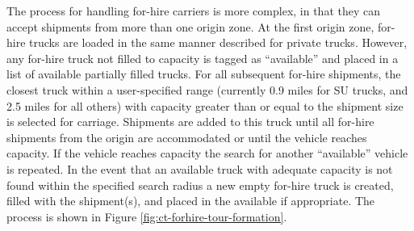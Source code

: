 The process for handling for-hire carriers is more complex, in that they can accept shipments from more than one origin zone. At the first origin zone, for-hire trucks are loaded in the same manner described for private trucks. However, any for-hire truck not filled to capacity is tagged as ``available'' and placed in a list of available partially filled trucks. For all subsequent for-hire shipments, the closest truck within a user-specified range (currently 0.9 miles for SU trucks, and 2.5 miles for all others) with capacity greater than or equal to the shipment size is selected for carriage. Shipments are added to this truck until all for-hire shipments from the origin are accommodated or until the vehicle reaches capacity. If the vehicle reaches capacity the search for another ``available'' vehicle is repeated. In the event that an available truck with adequate capacity is not found within the specified search radius a new empty for-hire truck is created, filled with the shipment(s), and placed in the available if appropriate. The process is shown in Figure \ref{fig:ct-forhire-tour-formation}.

